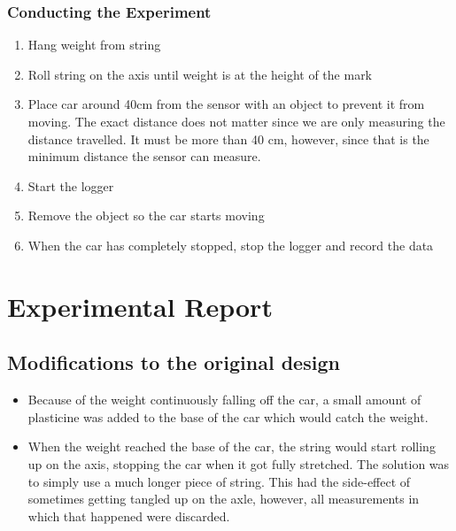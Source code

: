 \documentclass[titlepage,12pt]{article}
\begin{document}
        \subsubsection{Conducting the Experiment}
            \begin{enumerate}
                \item Hang weight from string
                \item Roll string on the axis until weight is at the height of the
                    mark
                \item Place car around 40cm from the sensor with an object to
                    prevent it from moving. The exact distance does not matter since
                    we are only measuring the distance travelled. It must be more
                    than 40 cm, however, since that is the minimum distance the
                    sensor can measure.  
                \item Start the logger
                \item Remove the object so the car starts moving
                \item When the car has completely stopped, stop the logger and
                    record the data
            \end{enumerate}

\section{Experimental Report}
    \subsection{Modifications to the original design}
    \begin{itemize}
        \item Because of the weight continuously falling off the car, a small
            amount of plasticine was added to the base of the car which would
            catch the weight.

        \item When the weight reached the base of the car, the string would
            start rolling up on the axis, stopping the car when it got fully
            stretched. The solution was to simply use a much longer piece of
            string. This had the side-effect of sometimes getting tangled up on
            the axle, however, all measurements in which that happened were
            discarded.
    \end{itemize}
\end{document}
